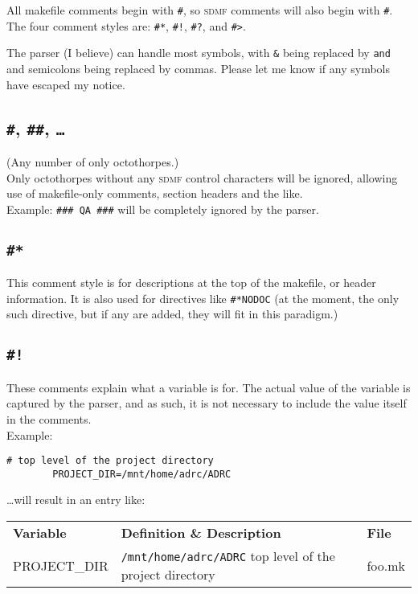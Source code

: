 \documentclass[oneside,11pt]{article}
\newcommand{\sdmf}{\textsc{sdmf}}
\begin{document}
	All makefile comments begin with \texttt{\#}, so \sdmf{} comments will also begin with \texttt{\#}. The four comment styles are: \texttt{\#*}, \texttt{\#!}, \texttt{\#?}, and \texttt{\#>}.
	
	The parser (I believe) can handle most symbols, with \texttt{\&} being replaced by \texttt{and} and semicolons being replaced by commas. Please let me know if any symbols have escaped my notice.
	
	\subsection{\texttt{\#}, \texttt{\#\#}, \texttt{\ldots}}
	
	(Any number of only octothorpes.) \\ Only octothorpes without any \sdmf{} control characters will be ignored, allowing use of  makefile-only comments, section headers and the like. \\ Example: \texttt{\#\#\# QA \#\#\#} will be completely ignored by the parser.
	
	\subsection{\texttt{\#*}}
	
	This comment style is for descriptions at the top of the makefile, or header information. It is also used for directives like \texttt{\#*NODOC} (at the moment, the only such directive, but if any are added, they will fit in this paradigm.)
	
	\subsection{\texttt{\#!}}
	
	These comments explain what a variable is for. The actual value of the variable is captured by the parser, and as such, it is not necessary to include the value itself in the comments. \\
	Example: 
	\begin{lstlisting}[gobble=16, basicstyle=\ttfamily]
		# top level of the project directory
		PROJECT_DIR=/mnt/home/adrc/ADRC 
	\end{lstlisting}
	
	\ldots will result in an entry like: \\
	
	\begin{tabularx}{\textwidth}{>{\ttfamily}l X >{\ttfamily}l}
		\rowcolor{gray!50}
		\textbf{Variable} & \textbf{Definition \& Description} & \textbf{File} \\
		PROJECT\_DIR	& \texttt{/mnt/home/adrc/ADRC} \newline top level of the project directory & foo.mk \\
		\bottomrule
	\end{tabularx}
	
\end{document}
